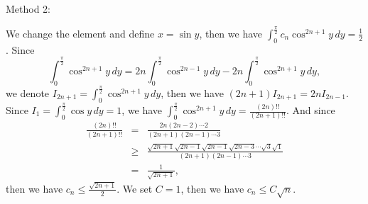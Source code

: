 \documentclass[12pt]{article}
\begin{document}
Method 2:

We change the element and define $x = \sin y$, then we have $\int_{0}^{\frac{\pi}{2}}  c_{n} \cos^{2n+1}y \, d y = \frac{1}{2}$. Since 
\begin{equation*}
   \int_{0}^{\frac{\pi}{2}} \cos^{2n+1}y \, d y = 2n \int_{0}^{\frac{\pi}{2}} \cos^{2n-1}y \, d y - 2n \int_{0}^{\frac{\pi}{2}} \cos^{2n+1}y \, d y,
\end{equation*}
we denote $I_{2n + 1} = \int_{0}^{\frac{\pi}{2}} \cos^{2n+1}y \, d y$, then we have $(2n + 1)I_{2n+1} = 2n I_{2n-1}$. Since $I_{1} = \int_{0}^{\frac{\pi}{2}} \cos y \, d y = 1$, we have $\int_{0}^{\frac{\pi}{2}} \cos^{2n+1}y \, d y = \frac{(2n)!!}{(2n+1)!!}$. And since
\begin{eqnarray*}
\frac{(2n)!!}{(2n+1)!!} &=&  \frac{2n (2n-2) \cdots 2}{(2n+1) (2n-1) \cdots 3}  \\
            &\geq& \frac{\sqrt{2n+1}\sqrt{2n-1}\sqrt{2n-1}\sqrt{2n-3} \cdots \sqrt{3}\sqrt{1}}{(2n+1) (2n-1) \cdots 3} \\
            &=& \frac{1}{\sqrt{2n+1}},
\end{eqnarray*}
then we have $c_{n} \leq \frac{\sqrt{2n+1}}{2}$. We set $C = 1$, then we have $c_{n} \leq C \sqrt{n}$.
\end{document}
